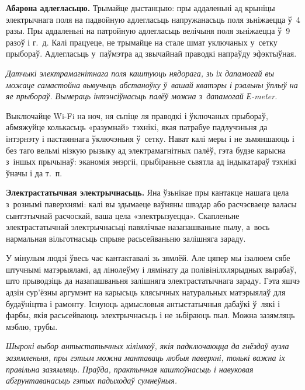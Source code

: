 
\textbf{Абарона адлегласьцю.} Трымайце дыстанцыю: пры аддаленьні ад крыніцы электрычнага поля на падвойную адлегласьць напружанасьць поля зьніжаецца ў~4 разы. Пры аддаленьні на патройную адлегласьць велічыня поля зьніжаецца ў~9 разоў і г.~д. Калі працуеце, не трымайце на стале шмат уключаных у~сетку прыбораў. Адлегласьць у~паўмэтра ад звычайнай праводкі напраўду эфэктыўная.

\emph{Датчыкі электрамагнітнага поля каштуюць нядорага, зь іх дапамогай вы можаце самастойна вывучыць абстаноўку ў~вашай кватэры і рэальны ўплыў на яе прыбораў. Вымераць інтэнсіўнасьць палёў можна з~дапамогай Е-meter.}

Выключайце Wi-Fi на ноч, ня сьпіце ля праводкі і ўключаных прыбораў, абмяжуйце колькасьць «разумнай» тэхнікі, якая патрабуе падлучэньня да інтэрнэту і пастаяннага ўключэньня ў~сетку. Нават калі меры і не зьмяншаюць і без таго вельмі нізкую рызыку ад электрамагнітных палёў, гэта будзе карысна з~іншых прычынаў: эканомія энэргіі, прыбіраньне сьвятла ад індыкатараў тэхнікі ўначы і да т.~п.

\textbf{Электрастатычная электрычнасьць.} Яна ўзьнікае пры кантакце нашага цела з~рознымі паверхнямі: калі вы здымаеце ваўняны швэдар або расчэсваеце валасы сынтэтычнай расчоскай, ваша цела «электрызуецца». Скапленьне электрастатычнай электрычнасьці павялічвае назапашваньне пылу, а~вось нармальная вільготнасьць спрыяе расьсейваньню залішняга зараду.


У мінулым людзі ўвесь час кантактавалі зь зямлёй. Але цяпер мы ізалюем сябе штучнымі матэрыяламі, ад лінолеўму і лямінату да полівінілхлярыдных вырабаў, што прыводзіць да назапашваньня залішняга электрастатычнага зараду. Гэта яшчэ адзін сур'ёзны аргумэнт на карысьць клясычных натуральных матэрыялаў для будаўніцтва і рамонту. Існуюць адмысловыя антыстатычныя дабаўкі ў~лякі і фарбы, якія расьсейваюць электрычнасьць і не зьбіраюць пыл. Можна зазямляць мэблю, трубы.

\emph{Шырокі выбор антыстатычных кілімкоў, якія падключаюцца да гнёздаў вузла зазямленьня, пры гэтым можна мантаваць любыя паверхні, толькі важна іх правільна зазямляць. Праўда, практычная каштоўнасьць і навуковая абгрунтаванасьць гэтых падыходаў сумнеўныя.}

